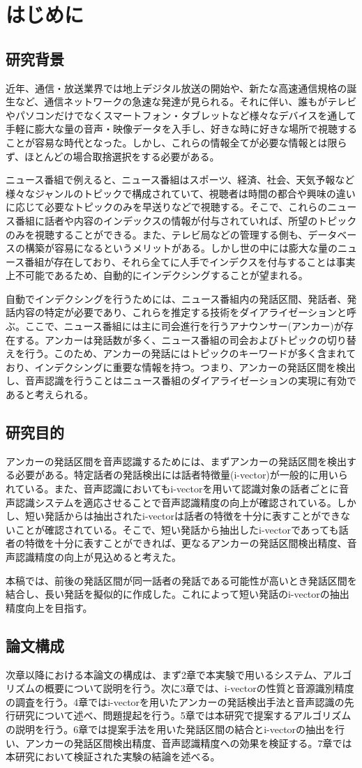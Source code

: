 \chapter{はじめに}

\section{研究背景}
近年、通信・放送業界では地上デジタル放送の開始や、新たな高速通信規格の誕生など、通信ネットワークの急速な発達が見られる。それに伴い、誰もがテレビやパソコンだけでなくスマートフォン・タブレットなど様々なデバイスを通して手軽に膨大な量の音声・映像データを入手し、好きな時に好きな場所で視聴することが容易な時代となった。しかし、これらの情報全てが必要な情報とは限らず、ほとんどの場合取捨選択をする必要がある。\par
ニュース番組で例えると、ニュース番組はスポーツ、経済、社会、天気予報など様々なジャンルのトピックで構成されていて、視聴者は時間の都合や興味の違いに応じて必要なトピックのみを早送りなどで視聴する。そこで、これらのニュース番組に話者や内容のインデックスの情報が付与されていれば、所望のトピックのみを視聴することができる。また、テレビ局などの管理する側も、データベースの構築が容易になるというメリットがある。しかし世の中には膨大な量のニュース番組が存在しており、それら全てに人手でインデクスを付与することは事実上不可能であるため、自動的にインデクシングすることが望まれる。\par
自動でインデクシングを行うためには、ニュース番組内の発話区間、発話者、発話内容の特定が必要であり、これらを推定する技術をダイアライゼーションと呼ぶ。ここで、ニュース番組には主に司会進行を行うアナウンサー(アンカー)が存在する。アンカーは発話数が多く、ニュース番組の司会およびトピックの切り替えを行う。このため、アンカーの発話にはトピックのキーワードが多く含まれており、インデクシングに重要な情報を持つ。つまり、アンカーの発話区間を検出し、音声認識を行うことはニュース番組のダイアライゼーションの実現に有効であると考えられる。

\section{研究目的}
アンカーの発話区間を音声認識するためには、まずアンカーの発話区間を検出する必要がある。特定話者の発話検出には話者特徴量(i-vector)が一般的に用いられている。また、音声認識においてもi-vectorを用いて認識対象の話者ごとに音声認識システムを適応させることで音声認識精度の向上が確認されている。しかし、短い発話からは抽出されたi-vectorは話者の特徴を十分に表すことができない\cite{panaiv}ことが確認されている。そこで、短い発話から抽出したi-vectorであっても話者の特徴を十分に表すことができれば、更なるアンカーの発話区間検出精度、音声認識精度の向上が見込めると考えた。\par
本稿では、前後の発話区間が同一話者の発話である可能性が高いとき発話区間を結合し、長い発話を擬似的に作成した。これによって短い発話のi-vectorの抽出精度向上を目指す。

\section{論文構成}
次章以降における本論文の構成は、まず2章で本実験で用いるシステム、アルゴリズムの概要について説明を行う。次に3章では、i-vectorの性質と音源識別精度の調査を行う。4章ではi-vectorを用いたアンカーの発話検出手法と音声認識の先行研究について述べ、問題提起を行う。5章では本研究で提案するアルゴリズムの説明を行う。6章では提案手法を用いた発話区間の結合とi-vectorの抽出を行い、アンカーの発話区間検出精度、音声認識精度への効果を検証する。7章では本研究において検証された実験の結論を述べる。

